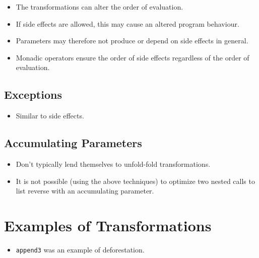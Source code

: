 \begin{itemize}

\item The transformations can alter the order of evaluation.

\item If side effects are allowed, this may cause an altered program behaviour.

\item Parameters may therefore not produce or depend on side effects in
general.

\item Monadic operators ensure the order of side effects regardless of the
order of evaluation.

\end{itemize}

\subsection{Exceptions}

\begin{itemize}

\item Similar to side effects.

\end{itemize}

\subsection{Accumulating Parameters}

\begin{itemize}

\item Don't typically lend themselves to unfold-fold transformations.

\item It is not possible (using the above techniques) to optimize two nested
calls to list reverse with an accumulating parameter.

\end{itemize}

\section{Examples of Transformations}

\begin{itemize}

\item \texttt{append3} was an example of deforestation.

\end{itemize}

